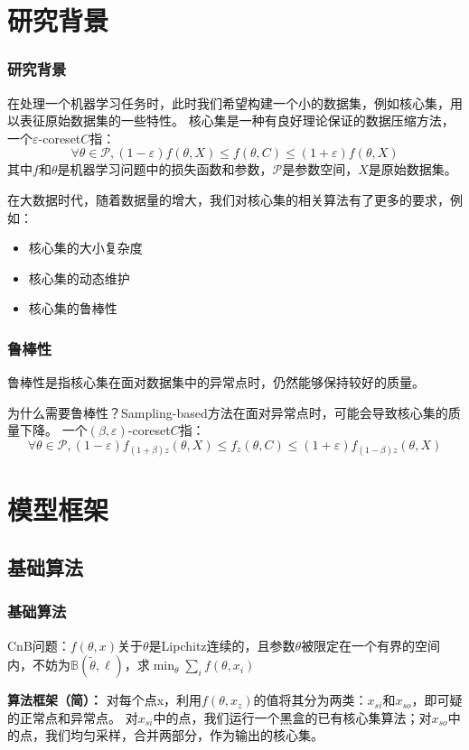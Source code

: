 \documentclass[aspectratio=169]{ctexbeamer}
\begin{document}
\section{研究背景}
\begin{frame}
  \frametitle{研究背景}
在处理一个机器学习任务时，此时我们希望构建一个小的数据集，例如核心集，用以表征原始数据集的一些特性。
核心集是一种有良好理论保证的数据压缩方法，一个$\varepsilon$-coreset$C$指：
\begin{equation*}
  \forall \theta \in \mathcal{P},(1-\varepsilon)f(\theta,X)\leq f(\theta,C)    \leq(1+\varepsilon)f(\theta,X)
\end{equation*}
其中$f$和$\theta$是机器学习问题中的损失函数和参数，$\mathcal{P}$是参数空间，$X$是原始数据集。

在大数据时代，随着数据量的增大，我们对核心集的相关算法有了更多的要求，例如：
\begin{itemize}
  \item 核心集的大小复杂度
  \item 核心集的动态维护
  \item 核心集的鲁棒性
\end{itemize}
\end{frame}

\begin{frame}
  \frametitle{鲁棒性}
  鲁棒性是指核心集在面对数据集中的异常点时，仍然能够保持较好的质量。

  为什么需要鲁棒性？Sampling-based方法在面对异常点时，可能会导致核心集的质量下降。
  \pause
  一个$(\beta,\varepsilon)$-coreset$C$指：
  \begin{equation*}
    \forall \theta \in \mathcal{P},(1-\varepsilon)f_{(1+\beta)z}(\theta,X)\leq f_z(\theta,C)    \leq(1+\varepsilon)f_{(1-\beta)z}(\theta,X)
  \end{equation*}
\end{frame}


\section{模型框架}
\subsection{基础算法}
\begin{frame}
  \frametitle{基础算法}
  CnB问题：$f(\theta,x)$关于$\theta$是Lipchitz连续的，且参数$\theta$被限定在一个有界的空间内，不妨为$\mathbb{B}(\tilde{\theta},\ell)$，求$\min_\theta \sum_if(\theta,x_i)$
  
  \textbf{算法框架（简）：} 对每个点x，利用$f(\theta,x_z)$的值将其分为两类：$x_{si}$和$x_{so}$，即可疑的正常点和异常点。
  对$x_{si}$中的点，我们运行一个黑盒的已有核心集算法；对$x_{so}$中的点，我们均匀采样，合并两部分，作为输出的核心集。
\end{frame}
\end{document}
